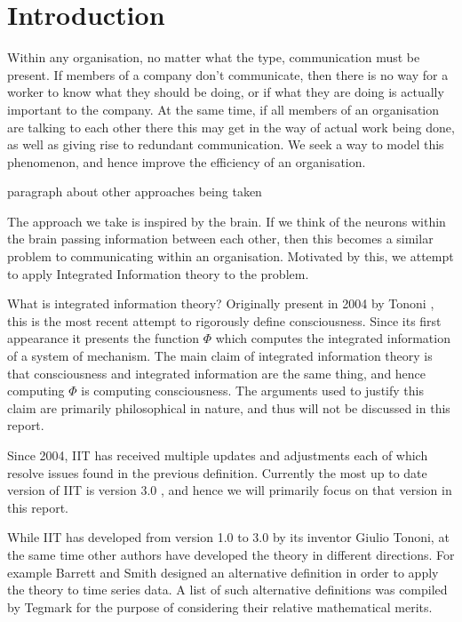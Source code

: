


\section{Introduction}
Within any organisation, no matter what the type, communication must be present. If members of a company don't communicate, then there is no way for a worker to know what they should be doing, or if what they are doing is actually important to the company. At the same time, if all members of an organisation are talking to each other there this may get in the way of actual work being done, as well as giving rise to redundant communication. We seek a way to model this phenomenon, and hence improve the efficiency of an organisation.

paragraph about other approaches being taken

The approach we take is inspired by the brain. If we think of the neurons within the brain passing information between each other, then this becomes a similar problem to communicating within an organisation. Motivated by this, we attempt to apply Integrated Information theory to the problem.

What is integrated information theory? Originally present in 2004 by Tononi \cite{tononi2004information}, this is the most recent attempt to rigorously define consciousness. Since its first appearance it presents the function $\Phi$ which computes the integrated information of a system of mechanism. The main claim of integrated information theory is that consciousness and integrated information are the same thing, and hence computing $\Phi$ is computing consciousness. The arguments used to justify this claim are primarily philosophical in nature, and thus will not be discussed in this report. 

Since 2004, IIT has received multiple updates and adjustments \cite{tononi2011integrated,balduzzi2008integrated,tononi2016consciousness} each of which resolve issues found in the previous definition. Currently the most up to date version of IIT is version 3.0 \cite{oizumi2014phenomenology}, and hence we will primarily focus on that version in this report.

While IIT has developed from version 1.0 to 3.0 by its inventor Giulio Tononi, at the same time other authors have developed the theory in different directions. For example Barrett and Smith \cite{barrett2011practical} designed an alternative definition in order to apply the theory to time series data. A list of such alternative definitions was compiled by Tegmark \cite{tegmark2016improved} for the purpose of considering their relative mathematical merits.


